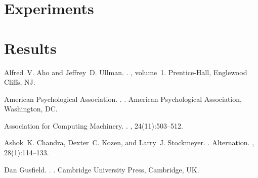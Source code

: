 \documentclass[11pt]{article}
\begin{document}
\section{Experiments}


\section{Results}


% 

\begin{thebibliography}{}

 Alfred~V. Aho and
    Jeffrey~D. Ullman.  .  , volume~1.  \newblock Prentice-{Hall}, Englewood
    Cliffs, NJ.

    {American Psychological Association}.  .  .  \newblock American Psychological Association,
    Washington, DC.

    {Association for Computing Machinery}.  .  , 24(11):503--512.

    Ashok~K. Chandra, Dexter~C. Kozen, and Larry~J. Stockmeyer.  .  \newblock Alternation.  , 28(1):114--133.

 Dan Gusfield.  .  .
    \newblock Cambridge University Press, Cambridge, UK.

\end{thebibliography}
\end{document}
